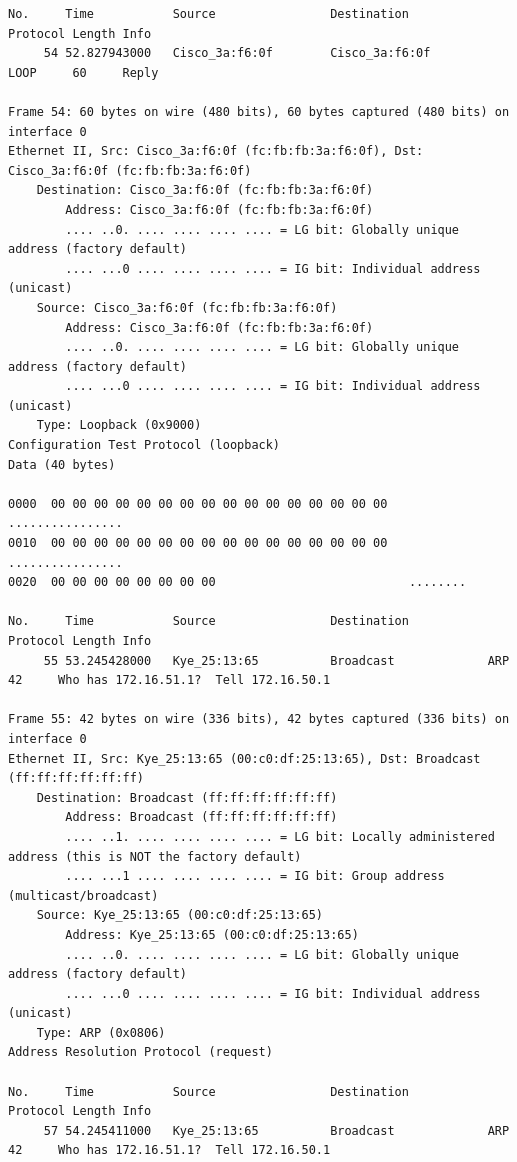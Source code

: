 \documentclass[a4paper,11pt]{article}
\begin{document}
\begin{lstlisting}
No.     Time           Source                Destination           Protocol Length Info
     54 52.827943000   Cisco_3a:f6:0f        Cisco_3a:f6:0f        LOOP     60     Reply

Frame 54: 60 bytes on wire (480 bits), 60 bytes captured (480 bits) on interface 0
Ethernet II, Src: Cisco_3a:f6:0f (fc:fb:fb:3a:f6:0f), Dst: Cisco_3a:f6:0f (fc:fb:fb:3a:f6:0f)
    Destination: Cisco_3a:f6:0f (fc:fb:fb:3a:f6:0f)
        Address: Cisco_3a:f6:0f (fc:fb:fb:3a:f6:0f)
        .... ..0. .... .... .... .... = LG bit: Globally unique address (factory default)
        .... ...0 .... .... .... .... = IG bit: Individual address (unicast)
    Source: Cisco_3a:f6:0f (fc:fb:fb:3a:f6:0f)
        Address: Cisco_3a:f6:0f (fc:fb:fb:3a:f6:0f)
        .... ..0. .... .... .... .... = LG bit: Globally unique address (factory default)
        .... ...0 .... .... .... .... = IG bit: Individual address (unicast)
    Type: Loopback (0x9000)
Configuration Test Protocol (loopback)
Data (40 bytes)

0000  00 00 00 00 00 00 00 00 00 00 00 00 00 00 00 00   ................
0010  00 00 00 00 00 00 00 00 00 00 00 00 00 00 00 00   ................
0020  00 00 00 00 00 00 00 00                           ........

No.     Time           Source                Destination           Protocol Length Info
     55 53.245428000   Kye_25:13:65          Broadcast             ARP      42     Who has 172.16.51.1?  Tell 172.16.50.1

Frame 55: 42 bytes on wire (336 bits), 42 bytes captured (336 bits) on interface 0
Ethernet II, Src: Kye_25:13:65 (00:c0:df:25:13:65), Dst: Broadcast (ff:ff:ff:ff:ff:ff)
    Destination: Broadcast (ff:ff:ff:ff:ff:ff)
        Address: Broadcast (ff:ff:ff:ff:ff:ff)
        .... ..1. .... .... .... .... = LG bit: Locally administered address (this is NOT the factory default)
        .... ...1 .... .... .... .... = IG bit: Group address (multicast/broadcast)
    Source: Kye_25:13:65 (00:c0:df:25:13:65)
        Address: Kye_25:13:65 (00:c0:df:25:13:65)
        .... ..0. .... .... .... .... = LG bit: Globally unique address (factory default)
        .... ...0 .... .... .... .... = IG bit: Individual address (unicast)
    Type: ARP (0x0806)
Address Resolution Protocol (request)

No.     Time           Source                Destination           Protocol Length Info
     57 54.245411000   Kye_25:13:65          Broadcast             ARP      42     Who has 172.16.51.1?  Tell 172.16.50.1


\end{lstlisting}
\end{document}
